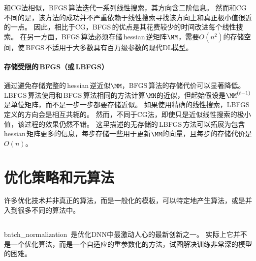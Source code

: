 和\gls{CG}法相似，\gls{BFGS}\,算法迭代一系列线性搜索，其方向含二阶信息。
然而和\gls{CG}不同的是，该方法的成功并不严重依赖于线性搜索寻找该方向上和真正极小值很近的一点。
因此，相比于\gls{CG}，\gls{BFGS}\,的优点是其花费较少的时间改进每个线性搜索。
在另一方面，\gls{BFGS}\,算法必须存储\,\gls{hessian}\,逆矩阵$\MM$，需要$O(n^2)$的存储空间，使\,\gls{BFGS}\,不适用于大多数具有百万级参数的现代\gls{DL}模型。

\paragraph{存储受限的\,\gls{BFGS}（或\,\gls{LBFGS}）}
通过避免存储完整的\,\gls{hessian}\,逆近似$\MM$，\gls{BFGS}\,算法的存储代价可以显著降低。
\gls{LBFGS}\,算法使用和\,\gls{BFGS}\,算法相同的方法计算$\MM$的近似，但起始假设是$\MM^{(t-1)}$是单位矩阵，而不是一步一步都要存储近似。
如果使用精确的线性搜索，\gls{LBFGS}\,定义的方向会是相互共轭的。
然而，不同于\gls{CG}法，即使只是近似线性搜索的极小值，该过程的效果仍然不错。
这里描述的无存储的\,\gls{LBFGS}\,方法可以拓展为包含\,\gls{hessian}\,矩阵更多的信息，每步存储一些用于更新$\MM$的向量，且每步的存储代价是$O(n)$。


\section{优化策略和元算法}
\label{sec:optimization_strategies_and_meta_algorithms}
许多优化技术并非真正的算法，而是一般化的模板，可以特定地产生算法，或是并入到很多不同的算法中。

\subsection{}
\label{sec:batch_normalization}
\gls{batch_normalization}~\citep{Ioffe-Szegedy-2015}是优化\gls{DNN}中最激动人心的最新创新之一。
实际上它并不是一个优化算法，而是一个自适应的重参数化的方法，试图解决训练非常深的模型的困难。

